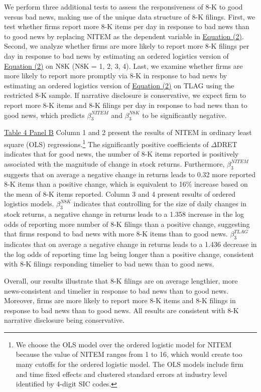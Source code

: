 \documentclass[letterpaper,11pt]{article}
\begin{document}
\begin{spacing}{1.5}
We perform three additional tests to assess the responsiveness of 8-K to good versus bad news, making use of the unique data structure of 8-K filings. First, we test whether firms report more 8-K items per day in response to bad news than to good news by replacing NITEM as the dependent variable in \hyperref[eq2]{Equation (2)}. Second, we analyze whether firms are more likely to report more 8-K filings per day in response to bad news by estimating an ordered logistics version of \hyperref[eq2]{Equation (2)} on N8K (N8K = 1, 2, 3, 4). Last, we examine whether firms are more likely to report more promptly via 8-K in response to bad news by estimating an ordered logistics version of \hyperref[eq2]{Equation (2)} on TLAG using the restricted 8-K sample. If narrative disclosure is conservative, we expect firm to report more 8-K items and 8-K filings per day in response to bad news than to good news, which predicts $\beta_3^{NITEM}$ and $\beta_3^{N8K}$ to be significantly negative.

\hyperref[T4PB]{Table 4 Panel B} Column 1 and 2 present the results of NITEM in ordinary least square (OLS) regressions.\footnote{We choose the OLS model over the ordered logistic model for NITEM because the value of NITEM ranges from 1 to 16, which would create too many cutoffs for the ordered logistic model. The OLS models include firm and time fixed effects and clustered standard errors at industry level identified by 4-digit SIC codes. } The significantly positive coefficients of $\Delta$DRET indicates that for good news, the number of 8-K items reported is positively associated with the magnitude of change in stock returns. Furthermore, $\beta_3^{NITEM}$ suggests that on average a negative change in returns leads to 0.32 more reported 8-K items than a positive change, which is equivalent to 16\% increase based on the mean of 8-K items reported. Column 3 and 4 present results of ordered logistics models. $\beta_3^{N8K}$ indicates that controlling for the size of daily changes in stock returns, a negative change in returns leads to a 1.358 increase in the log odds of reporting more number of 8-K filings than a positive change, suggesting that firms respond to bad news with more 8-K items than to good news. $\beta_3^{TLAG}$ indicates that on average a negative change in returns leads to a 1.436 decrease in the log odds of reporting time lag being longer than a positive change, consistent with 8-K filings responding timelier to bad news than to good news. 

Overall, our results illustrate that 8-K filings are on average lengthier, more news-consistent and timelier in response to bad news than to good news. Moreover, firms are more likely to report more 8-K items and 8-K filings in response to bad news than to good news. All results are consistent with 8-K narrative disclosure being conservative.


\end{spacing}
\end{document}
